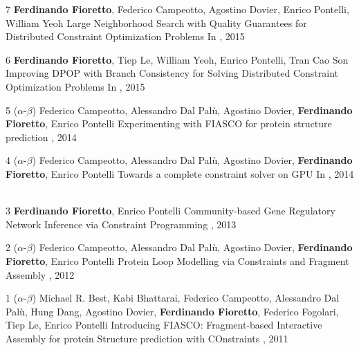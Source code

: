 \begin{pubs}
\wsentry
	{7} %
	{{\bf Ferdinando Fioretto}, Federico Campeotto, Agostino Dovier, Enrico Pontelli, William Yeoh}
	{Large Neighborhood Search with Quality Guarantees for Distributed Constraint Optimization Problems} 
	{In , 2015}
	{~}

\wsentry 
	{6} %
	{{\bf Ferdinando Fioretto}, Tiep Le, William Yeoh, Enrico Pontelli, Tran Cao Son}
	{Improving DPOP with Branch Consistency for Solving Distributed Constraint Optimization Problems}
	{In , 2015}
	{~}

\wsentry 
	{5} %
	{($\alpha$-$\beta$) 
	Federico Campeotto, Alessandro Dal Pal\`{u}, Agostino Dovier, {\bf Ferdinando Fioretto}, Enrico Pontelli} 
  	{Experimenting with FIASCO for protein structure prediction}
	{, 2014}
	{~}

\wsentry 
	{4} %
	{($\alpha$-$\beta$) Federico Campeotto, Alessandro Dal Pal\`{u}, Agostino Dovier, {\bf Ferdinando Fioretto}, Enrico Pontelli}
	{Towards a complete constraint solver on GPU}
	{In , 2014}
	{~}

\wsentry 
	{3} %
	{{\bf Ferdinando Fioretto}, Enrico Pontelli}
	{Community-based Gene Regulatory Network Inference via Constraint Programming}
	{, 2013}
	{~} 

\wsentry
	{2} %
	{($\alpha$-$\beta$) 
	Federico Campeotto, Alessandro Dal Pal\`{u}, Agostino Dovier, {\bf Ferdinando Fioretto}, Enrico Pontelli}
	{Protein Loop Modelling via Constraints and Fragment Assembly}
	{, 2012}
	{~} 

\wsentry 
	{1} %
	{($\alpha$-$\beta$) 
	Michael R. Best, Kabi Bhattarai, Federico Campeotto, Alessandro Dal Pal\`{u}, Hung Dang, Agostino Dovier, {\bf Ferdinando Fioretto}, Federico Fogolari, Tiep Le, Enrico Pontelli}
		{Introducing FIASCO: Fragment-based Interactive Assembly for protein Structure prediction with COnstraints}
 	 {, 2011}
  	{~}
\end{pubs}

